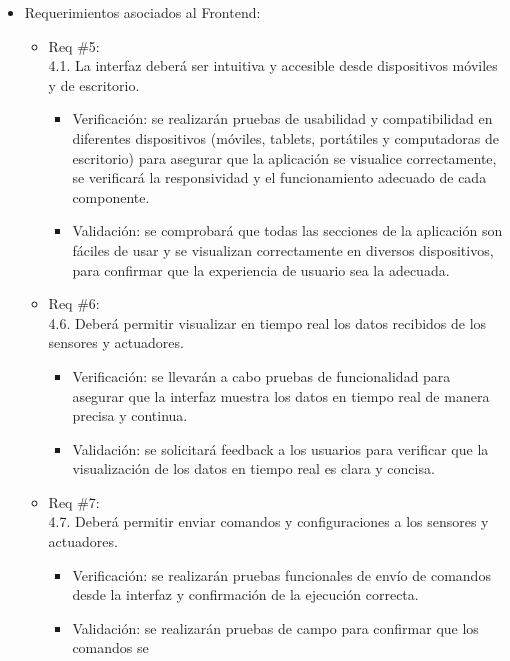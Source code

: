\begin{itemize}
	\item Requerimientos asociados al Frontend:
	      \begin{itemize}
		      \item Req \#5:\\ 4.1. La interfaz deberá ser intuitiva y accesible desde dispositivos
		            móviles y de escritorio.
		            \begin{itemize}
			            \item Verificación: se realizarán pruebas de usabilidad y compatibilidad en
			                  diferentes dispositivos (móviles, tablets, portátiles y computadoras de
			                  escritorio) para asegurar que la aplicación se visualice correctamente, se
			                  verificará la responsividad y el funcionamiento adecuado de cada componente.
			            \item Validación: se comprobará que todas las secciones de la aplicación son fáciles
			                  de usar y se visualizan correctamente en diversos dispositivos, para confirmar
			                  que la experiencia de usuario sea la adecuada.
		            \end{itemize}
		      \item Req \#6: \\ 4.6. Deberá permitir visualizar en tiempo real los datos recibidos
		            de los sensores y actuadores.
		            \begin{itemize}
			            \item Verificación: se llevarán a cabo pruebas de funcionalidad para asegurar que la
			                  interfaz muestra los datos en tiempo real de manera precisa y continua.
			            \item Validación: se solicitará feedback a los usuarios para verificar que la
			                  visualización de los datos en tiempo real es clara y concisa.
		            \end{itemize}
		      \item Req \#7: \\ 4.7. Deberá permitir enviar comandos y configuraciones a los
		            sensores y actuadores.
		            \begin{itemize}
			            \item Verificación: se realizarán pruebas funcionales de envío de comandos desde la
			                  interfaz y confirmación de la ejecución correcta.
			            \item Validación: se realizarán pruebas de campo para confirmar que los comandos se

\end{itemize}
\end{itemize}
\end{itemize}
